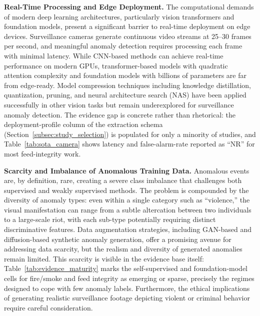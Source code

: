 \documentclass[10pt,a4paper]{article}
\begin{document}
\noindent\textbf{Real-Time Processing and Edge Deployment.} The computational demands of modern deep learning architectures, particularly vision transformers and foundation models, present a significant barrier to real-time deployment on edge devices. Surveillance cameras generate continuous video streams at 25--30 frames per second, and meaningful anomaly detection requires processing each frame with minimal latency. While CNN-based methods can achieve real-time performance on modern GPUs, transformer-based models with quadratic attention complexity and foundation models with billions of parameters are far from edge-ready. Model compression techniques including knowledge distillation, quantization, pruning, and neural architecture search (NAS) have been applied successfully in other vision tasks but remain underexplored for surveillance anomaly detection.  The evidence gap is concrete rather than rhetorical: the deployment-profile column of the extraction schema (Section~\ref{subsec:study_selection}) is populated for only a minority of studies, and Table~\ref{tab:sota_camera} shows latency and false-alarm-rate reported as ``NR'' for most feed-integrity work.

\noindent\textbf{Scarcity and Imbalance of Anomalous Training Data.} Anomalous events are, by definition, rare, creating a severe class imbalance that challenges both supervised and weakly supervised methods. The problem is compounded by the diversity of anomaly types: even within a single category such as ``violence,'' the visual manifestation can range from a subtle altercation between two individuals to a large-scale riot, with each sub-type potentially requiring distinct discriminative features. Data augmentation strategies, including GAN-based and diffusion-based synthetic anomaly generation, offer a promising avenue for addressing data scarcity, but the realism and diversity of generated anomalies remain limited.  This scarcity is visible in the evidence base itself: Table~\ref{tab:evidence_maturity} marks the self-supervised and foundation-model cells for fire/smoke and feed integrity as emerging or sparse, precisely the regimes designed to cope with few anomaly labels. Furthermore, the ethical implications of generating realistic surveillance footage depicting violent or criminal behavior require careful consideration.
\end{document}
